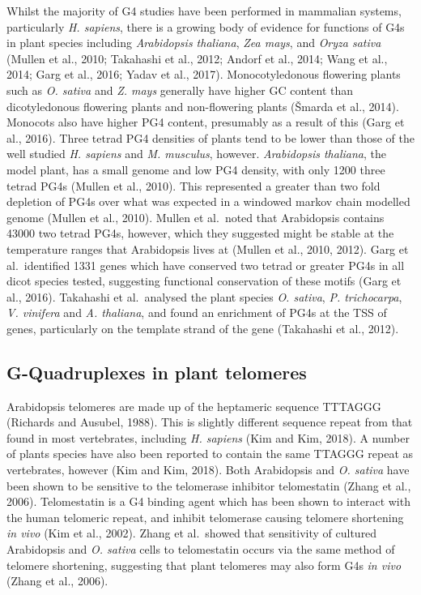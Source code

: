 \documentclass[12pt,a4paper,]{report}
\begin{document}
Whilst the majority of G4 studies have been performed in mammalian
systems, particularly \emph{H. sapiens}, there is a growing body of
evidence for functions of G4s in plant species including
\emph{Arabidopsis thaliana}, \emph{Zea mays}, and \emph{Oryza sativa}
(Mullen et al., 2010; Takahashi et al., 2012; Andorf et al., 2014; Wang
et al., 2014; Garg et al., 2016; Yadav et al., 2017). Monocotyledonous
flowering plants such as \emph{O. sativa} and \emph{Z. mays} generally
have higher GC content than dicotyledonous flowering plants and
non-flowering plants (Šmarda et al., 2014). Monocots also have higher
PG4 content, presumably as a result of this (Garg et al., 2016). Three
tetrad PG4 densities of plants tend to be lower than those of the well
studied \emph{H. sapiens} and \emph{M. musculus}, however.
\emph{Arabidopsis thaliana}, the model plant, has a small genome and low
PG4 density, with only 1200 three tetrad PG4s (Mullen et al., 2010).
This represented a greater than two fold depletion of PG4s over what was
expected in a windowed markov chain modelled genome (Mullen et al.,
2010). Mullen et al.~noted that Arabidopsis contains 43000 two tetrad
PG4s, however, which they suggested might be stable at the temperature
ranges that Arabidopsis lives at (Mullen et al., 2010, 2012). Garg et
al.~identified 1331 genes which have conserved two tetrad or greater
PG4s in all dicot species tested, suggesting functional conservation of
these motifs (Garg et al., 2016). Takahashi et al.~analysed the plant
species \emph{O. sativa}, \emph{P. trichocarpa}, \emph{V. vinifera} and
\emph{A. thaliana}, and found an enrichment of PG4s at the TSS of genes,
particularly on the template strand of the gene (Takahashi et al.,
2012).

\hypertarget{g-quadruplexes-in-plant-telomeres}{%
\subsection{G-Quadruplexes in plant
telomeres}\label{g-quadruplexes-in-plant-telomeres}}

Arabidopsis telomeres are made up of the heptameric sequence TTTAGGG
(Richards and Ausubel, 1988). This is slightly different sequence repeat
from that found in most vertebrates, including \emph{H. sapiens} (Kim
and Kim, 2018). A number of plants species have also been reported to
contain the same TTAGGG repeat as vertebrates, however (Kim and Kim,
2018). Both Arabidopsis and \emph{O. sativa} have been shown to be
sensitive to the telomerase inhibitor telomestatin (Zhang et al., 2006).
Telomestatin is a G4 binding agent which has been shown to interact with
the human telomeric repeat, and inhibit telomerase causing telomere
shortening \emph{in vivo} (Kim et al., 2002). Zhang et al.~showed that
sensitivity of cultured Arabidopsis and \emph{O. sativa} cells to
telomestatin occurs via the same method of telomere shortening,
suggesting that plant telomeres may also form G4s \emph{in vivo} (Zhang
et al., 2006).
\end{document}
